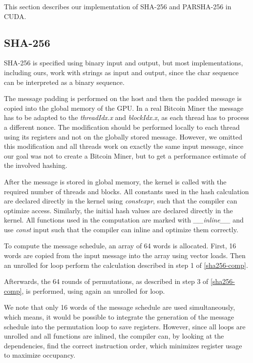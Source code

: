 \documentclass[letterpaper]{article}
\begin{document}
This section describes our implementation of SHA-256 and PARSHA-256 in CUDA.

\subsection{SHA-256}
SHA-256 is specified using binary input and output, but most implementations, including ours, work with strings as input and output, since the char sequence can be interpreted as a binary sequence. 

The message padding is performed on the host and then the padded message is copied into the global memory of the GPU. In a real Bitcoin Miner the message has to be adapted to the \emph{threadIdx.x} and \emph{blockIdx.x}, as each thread has to process a different nonce. The modification should be performed locally to each thread using its registers and not on the globally stored message. However, we omitted this modification and all threads work on exactly the same input message, since our goal was not to create a Bitcoin Miner, but to get a performance estimate of the involved hashing.

After the message is stored in global memory, the kernel is called with the required number of threads and blocks.
All constants used in the hash calculation are declared directly in the kernel using \emph{constexpr}, such that the compiler can optimize access. Similarly, the initial hash values are declared directly in the kernel. All functions used in the computation are marked with \emph{\_\_inline\_\_} and use \emph{const} input such that the compiler can inline and optimize them correctly.

To compute the message schedule, an array of 64 words is allocated. First, 16 words are copied from the input message into the array using vector loads. Then an unrolled for loop perform the calculation described in step 1 of \ref{sha256-comp}.

Afterwards, the 64 rounds of permutations, as described in step 3 of \ref{sha256-comp}, is performed, using again an unrolled for loop.

We note that only 16 words of the message schedule are used simultaneously, which means, it would be possible to integrate the generation of the message schedule into the permutation loop to save registers. However, since all loops are unrolled and all functions are inlined, the compiler can, by looking at the dependencies, find the correct instruction order, which minimizes register usage to maximize occupancy. 
\end{document}
